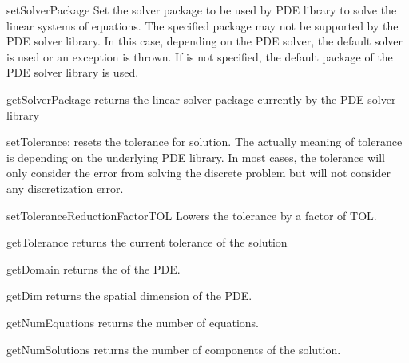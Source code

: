 \begin{methoddesc}[LinearPDE]{setSolverPackage}{}
Set the solver package to be used by PDE library to solve the linear systems of equations. The
specified package may not be supported by the PDE solver library. In this case, depending on
the PDE solver, the default solver is used or an exception is thrown.
If  is not specified, the default package of the PDE solver library is used.
\end{methoddesc}

\begin{methoddesc}[LinearPDE]{getSolverPackage}{}
returns the linear solver package currently by the PDE solver library
\end{methoddesc}


\begin{methoddesc}[LinearPDE]{setTolerance}{}:
resets the tolerance for solution. The actually meaning of tolerance is
depending on the underlying PDE library. In most cases, the tolerance
will only consider the error from solving the discrete problem but will
not consider any discretization error.
\end{methoddesc}

\begin{methoddesc}[LinearPDE]{setToleranceReductionFactor}{TOL}
Lowers the tolerance by a factor of TOL.
\end{methoddesc}

\begin{methoddesc}[LinearPDE]{getTolerance}{}
returns the current tolerance of the solution
\end{methoddesc}

\begin{methoddesc}[LinearPDE]{getDomain}{}
returns the \Domain of the PDE.
\end{methoddesc}

\begin{methoddesc}[LinearPDE]{getDim}{}
returns the spatial dimension of the PDE.
\end{methoddesc}

\begin{methoddesc}[LinearPDE]{getNumEquations}{}
returns the number of equations.
\end{methoddesc}

\begin{methoddesc}[LinearPDE]{getNumSolutions}{}
returns the number of components of the solution.
\end{methoddesc}

